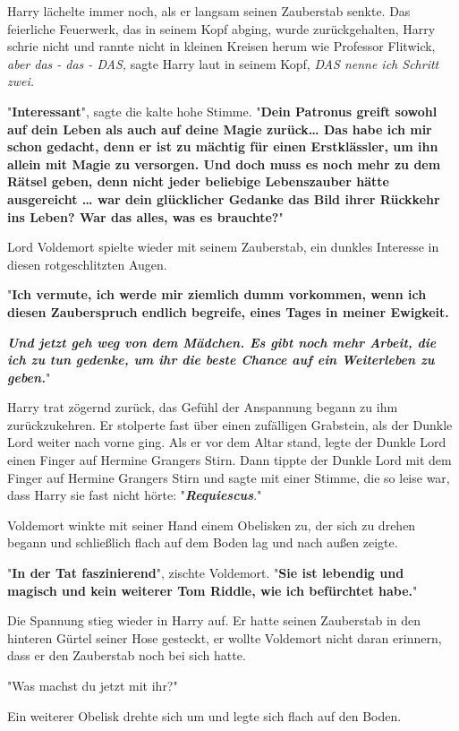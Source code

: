 {Harry lächelte immer noch, als er langsam seinen Zauberstab senkte. Das feierliche Feuerwerk, das in seinem Kopf abging, wurde zurückgehalten, Harry schrie nicht und rannte nicht in kleinen Kreisen herum wie Professor Flitwick, \emph{aber das - das - DAS,} sagte Harry laut in seinem Kopf, \emph{DAS nenne ich Schritt zwei.}

"\textbf{Interessant}", sagte die kalte hohe Stimme. "\textbf{Dein Patronus greift sowohl auf dein Leben als auch auf deine Magie zurück… Das habe ich mir schon gedacht, denn er ist zu mächtig für einen Erstklässler, um ihn allein mit Magie zu versorgen. Und doch muss es noch mehr zu dem Rätsel geben, denn nicht jeder beliebige Lebenszauber hätte ausgereicht … war dein glücklicher Gedanke das Bild ihrer Rückkehr ins Leben? War das alles, was es brauchte?}"

Lord Voldemort spielte wieder mit seinem Zauberstab, ein dunkles Interesse in diesen rotgeschlitzten Augen.

"\textbf{Ich vermute, ich werde mir ziemlich dumm vorkommen, wenn ich diesen Zauberspruch endlich begreife, eines Tages in meiner Ewigkeit.}

\textbf{\emph{Und jetzt geh weg von dem Mädchen. Es gibt noch mehr Arbeit, die ich zu tun gedenke, um ihr die beste Chance auf ein Weiterleben zu geben.}}"

Harry trat zögernd zurück, das Gefühl der Anspannung begann zu ihm zurückzukehren. Er stolperte fast über einen zufälligen Grabstein, als der Dunkle Lord weiter nach vorne ging. Als er vor dem Altar stand, legte der Dunkle Lord einen Finger auf Hermine Grangers Stirn. Dann tippte der Dunkle Lord mit dem Finger auf Hermine Grangers Stirn und sagte mit einer Stimme, die so leise war, dass Harry sie fast nicht hörte: "\textbf{\emph{Requiescus}}."

Voldemort winkte mit seiner Hand einem Obelisken zu, der sich zu drehen begann und schließlich flach auf dem Boden lag und nach außen zeigte.

"\textbf{In der Tat faszinierend}", zischte Voldemort. "\textbf{Sie ist lebendig und magisch und kein weiterer Tom Riddle, wie ich befürchtet habe.}"

Die Spannung stieg wieder in Harry auf. Er hatte seinen Zauberstab in den hinteren Gürtel seiner Hose gesteckt, er wollte Voldemort nicht daran erinnern, dass er den Zauberstab noch bei sich hatte.

"Was machst du jetzt mit ihr?"

Ein weiterer Obelisk drehte sich um und legte sich flach auf den Boden.

}
